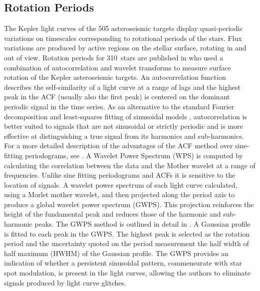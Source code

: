 \documentclass[10pt,preprint]{aastex}
\newcommand{\ngarcia}{310~}
\begin{document}
\subsection{Rotation Periods}
\label{sec:rotation_periods}

The Kepler light curves of the 505 asteroseismic targets display quasi-periodic variations on timescales corresponding to rotational periods of the stars.
Flux variations are produced by active regions on the stellar surface, rotating in and out of view.
Rotation periods for \ngarcia stars are published in \citet{Garcia2014} who used a combination of autocorrelation and wavelet transforms to measure surface rotation of the Kepler asteroseismic targets.
An autocorrelation function describes the self-similarity of a light curve at a range of lags and the highest peak in the ACF (usually also the first peak) is centered on the dominant periodic signal in the time series.
As an alternative to the standard Fourier decomposition and least-squares fitting of sinusoidal models \citep{Zechmeister}, autocorrelation is better suited to signals that are not sinusoidal or strictly periodic and is more effective at distinguishing a true signal from its harmonics and sub-harmonics.
For a more detailed description of the advantages of the ACF method over sine-fitting periodograms, see \citet{McQuillan}.
A Wavelet Power Spectrum (WPS) is computed by calculating the correlation between the data and the Mother wavelet at a range of frequencies.
Unlike sine fitting periodograms and ACFs it is sensitive to the location of signals.
A wavelet power spectrum of each light curve calculated, using a Morlet mother wavelet, and then projected along the period axis to produce a global wavelet power spectrum (GWPS).
This projection reinforces the height of the fundamental peak and reduces those of the harmonic and sub-harmonic peaks.
The GWPS method is outlined in detail in \citep{Mathur2014}.
A Gaussian profile is fitted to each peak in the GWPS.
The highest peak is selected as the rotation period and the uncertainty quoted on the period measurement the half width of half maximum (HWHM) of the Gaussian profile.
The GWPS provides an indication of whether a persistent sinusoidal pattern, commensurate with star spot modulation, is present in the light curves, allowing the authors to eliminate signals produced by light curve glitches.
\end{document}
